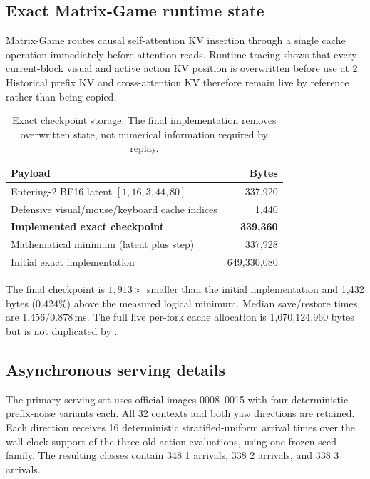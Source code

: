 \subsection{Exact Matrix-Game runtime state}

Matrix-Game routes causal self-attention KV insertion through a single cache
operation immediately before attention reads. Runtime tracing shows that every
current-block visual and active action KV position is overwritten before use
at \nfe{}2. Historical prefix KV and cross-attention KV therefore remain live
by reference rather than being copied.

\begin{table}[h]
  \centering
  \caption{Exact checkpoint storage. The final implementation removes
  overwritten state, not numerical information required by replay.}
  \small
  \begin{tabular}{lr}
    \toprule
    Payload & Bytes \\
    \midrule
    Entering-\nfe{}2 BF16 latent $[1,16,3,44,80]$ & 337,920 \\
    Defensive visual/mouse/keyboard cache indices & 1,440 \\
    \textbf{Implemented exact checkpoint} & \textbf{339,360} \\
    Mathematical minimum (latent plus step) & 337,928 \\
    Initial exact implementation & 649,330,080 \\
    \bottomrule
  \end{tabular}
\end{table}

The final checkpoint is $1{,}913\times$ smaller than the initial
implementation and 1,432 bytes (0.424\%) above the measured logical minimum.
Median save/restore times are 1.456/0.878\,ms. The full live per-fork cache
allocation is 1,670,124,960 bytes but is not duplicated by \method{}.

\subsection{Asynchronous serving details}

The primary serving set uses official images 0008--0015 with four deterministic
prefix-noise variants each. All 32 contexts and both yaw directions are
retained. Each direction receives 16 deterministic stratified-uniform arrival
times over the wall-clock support of the three old-action evaluations, using
one frozen seed family. The resulting classes contain 348 \nfe{}1 arrivals,
338 \nfe{}2 arrivals, and 338 \nfe{}3 arrivals.

